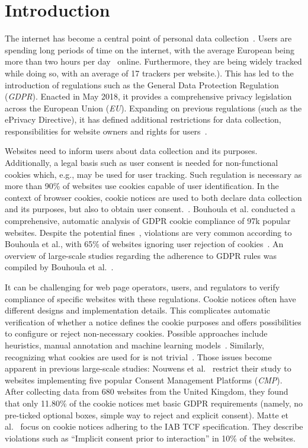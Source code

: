 \chapter{Introduction} \label{chap:introduction}

The internet has become a central point of personal data collection~\cite{kretschmer2021cookie}.
Users are spending long periods of time on the internet, with the average European being more than two hours per day~\cite{kretschmer2021cookie} online.
Furthermore, they are being widely tracked while doing so, with an average of 17 trackers per website.\cite{kretschmer2021cookie}).
This has led to the introduction of regulations such as the General Data Protection Regulation (\emph{GDPR}). 
Enacted in May 2018, it provides a comprehensive privacy legislation across the European Union (\emph{EU}).
Expanding on previous regulations (such as the ePrivacy Directive), it has defined additional restrictions for data collection, responsibilities for website owners and rights for users~\cite{kretschmer2021cookie}.

Websites need to inform users about data collection and its purposes.
Additionally, a legal basis such as user consent is needed for non-functional cookies which, e.g., may be used for user tracking.
Such regulation is necessary as more than 90\% of websites use cookies capable of user identification.
In the context of browser cookies, cookie notices are used to both declare data collection and its purposes, but also to obtain user consent.~\cite{bouhoula2023automated}.
Bouhoula et al. conducted a comprehensive, automatic analysis of GDPR cookie compliance of 97k popular websites.
Despite the potential fines~\cite{sanchez_rola2019can}, violations are very common according to Bouhoula et al., with 65\% of websites ignoring user rejection of cookies~\cite{bouhoula2023automated}.
An overview of large-scale studies regarding the adherence to GDPR rules was compiled by Bouhoula et al.~\cite{bouhoula2023automated}.

It can be challenging for web page operators, users, and regulators to verify compliance of specific websites with these regulations.
Cookie notices often have different designs and implementation details.
This complicates automatic verification of whether a notice defines the cookie purposes and offers possibilities to configure or reject non-necessary cookies.
Possible approaches include heuristics, manual annotation and machine learning models~\cite{kretschmer2021cookie, bouhoula2023automated}.
Similarly, recognizing what cookies are used for is not trivial~\cite{sanchez_rola2019can, bollinger2022automating}.
Those issues become apparent in previous large-scale studies:
Nouwens et al.~\cite{nouwens2020dark} restrict their study to websites implementing five popular Consent Management Platforms (\emph{CMP}).
After collecting data from 680 websites from the United Kingdom, they found that only 11.80\% of the cookie notices met basic GDPR requirements (namely, no pre-ticked optional boxes, simple way to reject and explicit consent).
Matte et al.~\cite{matte2020cookiebannersrespectchoice} focus on cookie notices adhering to the IAB TCF specification.
They describe violations such as \enquote{Implicit consent prior to interaction} in 10\% of the websites.

